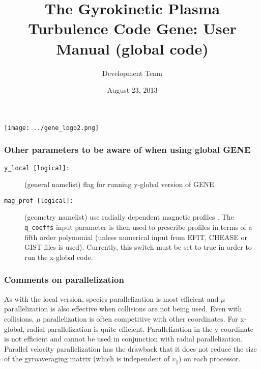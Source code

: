 \documentclass[12pt]{article}
\begin{document}
\title{The Gyrokinetic Plasma Turbulence Code {\sc Gene}: User Manual (global code)}
\vspace{1cm}
\date{\Large August 23, 2013}
\author{\gene Development Team}

\maketitle

\vspace{2cm}
\begin{center}
\texttt{[image: ../gene\_logo2.png]}
\end{center}

\newpage

\subsubsection{Other parameters to be aware of when using global GENE}

\begin{description}
\item[\texttt{y\_local [logical]:}] (general namelist) flag for running y-global version of GENE.
\item[\texttt{mag\_prof [logical]:}] (geometry namelist) use radially dependent magnetic profiles . The \texttt{q\_coeffs} input parameter is then used to prescribe profiles in terms of a fifth order polynomial (unless numerical input from EFIT, CHEASE or GIST files is used). Currently, this switch must be set to true in order to run the x-global code. 
\end{description}

\subsubsection{Comments on parallelization}

As with the local version, species parallelization is most efficient and $\mu$ parallelization is also effective when collisions are not being used.  Even with collisions, $\mu$ parallelization is often competitive with other coordinates.  For x-global, radial parallelization is quite efficient.  Parallelization in the y-coordinate is not efficient and cannot be used in conjunction with radial parallelization.  Parallel velocity parallelization has the drawback that it does not reduce the size of the gyroaveraging matrix (which is independent of $v_{||}$) on each processor. 


% 
% 
% 



\end{document}
